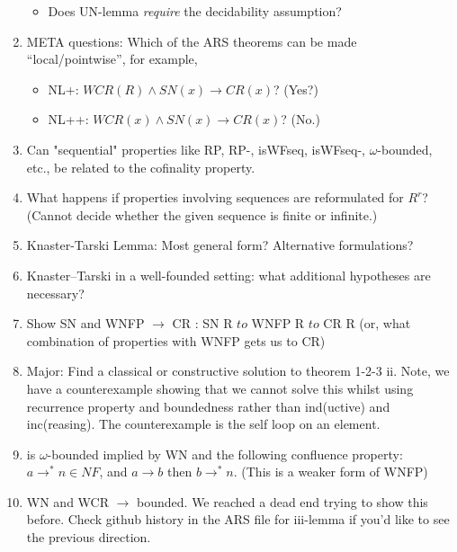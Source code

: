 \documentclass{scrartcl}
\begin{document}
\begin{enumerate}
\begin{itemize}
        \item Does UN-lemma \emph{require} the decidability assumption?
      \end{itemize}
    \item META questions: Which of the ARS theorems can be made ``local/pointwise'',
    for example,
    \begin{itemize}
      \item NL+: $WCR(R) \land SN(x) \to CR(x)$?  (Yes?)
      \item NL++: $WCR(x) \land SN(x) \to CR(x)$? (No.)
    \end{itemize}
    \item Can "sequential" properties like RP, RP-, isWFseq, isWFseq-, $\omega$-bounded, etc.,
      be related to the cofinality property.
      \item What happens if properties involving sequences are reformulated for
    $R^r$? (Cannot decide whether the given sequence is finite or infinite.)
    \item Knaster-Tarski Lemma: Most general form? Alternative formulations?
    \item Knaster--Tarski in a well-founded setting: what additional
    hypotheses are necessary?
    \item Show SN and WNFP $\to$ CR : SN R $to$ WNFP R $to$ CR R (or, what combination of properties with WNFP gets us to CR)
    \item Major: Find a classical or constructive solution to theorem 1-2-3 ii. Note, we have a counterexample showing that we 
    cannot solve this whilst using recurrence property and boundedness rather than ind(uctive) and inc(reasing). The counterexample is the self loop on an element. 
    \item is $\omega$-bounded implied by WN and the following confluence property:
    $a \to^* n \in NF$, and $a \to b$ then $b \to^* n $. (This is a weaker form of WNFP)
    \item WN and WCR $\to$ bounded. We reached a dead end trying to show this before. Check github history in the ARS file for iii-lemma 
    if you'd like to see the previous direction.
  \end{enumerate}
\end{document}
